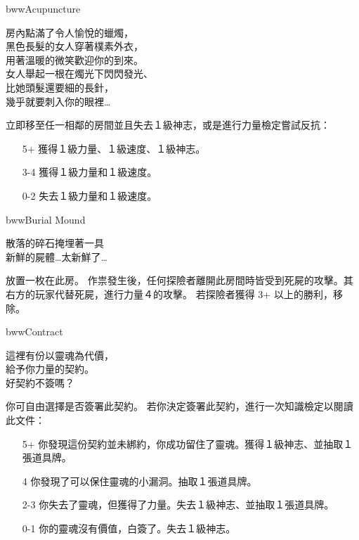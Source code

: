 %
\begin{EventCard}{bww}{Acupuncture}
  \begin{CardStory}
    房內點滿了令人愉悅的蠟燭，\\
    黑色長髮的女人穿著樸素外衣，\\
    用著溫暖的微笑歡迎你的到來。\\
    女人舉起一根在燭光下閃閃發光、\\
    比她頭髮還要細的長針，\\
    幾乎就要刺入你的眼裡…
  \end{CardStory}
  立即移至任一相鄰的房間並且失去１級神志，或是進行力量檢定嘗試反抗：
  \begin{itemize}
    \item[5+] 獲得１級力量、１級速度、１級神志。
    \item[3-4] 獲得１級力量和１級速度。
    \item[0-2] 失去１級力量和１級速度。
  \end{itemize}
\end{EventCard}%
\linebreak[0]%
\begin{EventCard}{bww}{Burial Mound}
  \begin{CardStory}
    散落的碎石掩埋著一具\\
    新鮮的屍體…太新鮮了…
  \end{CardStory}
  放置一枚在此房。\smallbreak
  作祟發生後，任何探險者離開此房間時皆受到死屍的攻擊。其右方的玩家代替死屍，進行力量４的攻擊。\smallbreak
  若探險者獲得 3+ 以上的勝利，移除。\smallbreak
\end{EventCard}%
\linebreak[0]%
\begin{EventCard}{bww}{Contract}
  \begin{CardStory}
    這裡有份以靈魂為代價，\\
    給予你力量的契約。\\
    好契約不簽嗎？
  \end{CardStory}
  你可自由選擇是否簽署此契約。\smallbreak
  若你決定簽署此契約，進行一次知識檢定以閱讀此文件：
  \begin{itemize}
    \item[5+] 你發現這份契約並未綁約，你成功留住了靈魂。獲得１級神志、並抽取１張道具牌。
    \item[4] 你發現了可以保住靈魂的小漏洞。抽取１張道具牌。
    \item[2-3] 你失去了靈魂，但獲得了力量。失去１級神志、並抽取１張道具牌。
    \item[0-1] 你的靈魂沒有價值，白簽了。失去１級神志。
  \end{itemize}
\end{EventCard}%
